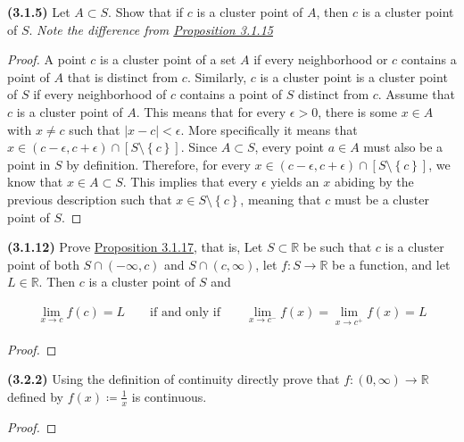 \documentclass[12pt]{article}
\newcommand{\set}[1]{\left\{ {#1} \right\}}
\newcommand{\limit}[1]{\displaystyle \lim_{ {#1} }}
\newcommand{\abs}[1]{\left| {#1} \right|}
\newcommand{\paren}[1]{\left( {#1} \right)}
\newcommand{\bR}{\mathbb{R}}
\begin{document}
\pagestyle{fancy}
\setlength{\headheight}{14.49998pt}
\fancyfoot[C]{\thepage}

\noindent \textbf{(3.1.5)} Let $A\subset S$. Show that if $c$ is a cluster point of $A$, then $c$ is a cluster point of $S$. \textit{Note the difference from \underline{Proposition 3.1.15}}

\begin{proof}
	A point $c$ is a cluster point of a set $A$ if every neighborhood or $c$ contains a point of $A$ that is distinct from $c$. Similarly, $c$ is a cluster point is a cluster point of $S$ if every neighborhood of $c$ contains a point of $S$ distinct from $c$. Assume that $c$ is a cluster point of $A$. This means that for every $\epsilon>0$, there is some $x\in A$ with $x\neq c$ such that $\abs{x-c}<\epsilon$. More specifically it means that $x\in\paren{c-\epsilon, c+\epsilon}\cap [S\setminus\set{c}]$. Since $A\subset S$, every point $a\in A$ must also be a point in $S$ by definition. Therefore, for every $x\in\paren{c-\epsilon, c+\epsilon}\cap [S\setminus\set{c}]$, we know that $x\in A\subset S$. This implies that every $\epsilon$ yields an $x$ abiding by the previous description such that $x\in S\setminus\set{c}$, meaning that $c$ must be a cluster point of $S$.
\end{proof}

\newpage

\noindent \textbf{(3.1.12)} Prove \underline{Proposition 3.1.17}, that is, Let $S\subset\bR$ be such that $c$ is a cluster point of both $S\cap\paren{-\infty, c}$ and $S\cap\paren{c,\infty}$, let $f:S\to\bR$ be a function, and let $L\in\bR$. Then $c$ is a cluster point of $S$ and

\begin{align*}
	\limit{x\to c}f(c)=L\qquad\text{if and only if}\qquad\limit{x\to c^-}f(x)=\limit{x\to c^+}f(x)=L
\end{align*}

\begin{proof}
	\lipsum[1]
\end{proof}

\newpage

\noindent \textbf{(3.2.2)} Using the definition of continuity directly prove that $f:\paren{0,\infty}\to\bR$ defined by $f(x)\coloneq\frac{1}{x}$ is continuous.

\begin{proof}
	\lipsum[1]
\end{proof}
\end{document}
